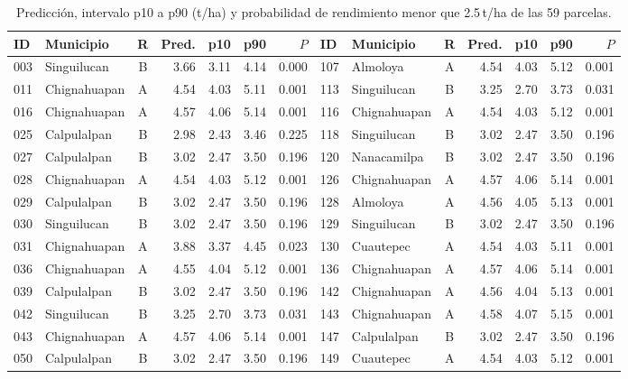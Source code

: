 \documentclass[conference,letterpaper]{IEEEtran}
\begin{document}
\begin{table}[!t]
\centering
\caption{Predicción, intervalo p10 a p90 (t/ha) y probabilidad de rendimiento menor que 2.5\,t/ha de las 59 parcelas.}
\label{tab:predicciones}
\scriptsize
\setlength{\tabcolsep}{3.5pt}
\begin{tabular}{@{}llcrrrr@{\hspace{1.6em}}llcrrrr@{}}
\toprule
ID & Municipio & R & Pred. & p10 & p90 & $P$ & ID & Municipio & R & Pred. & p10 & p90 & $P$ \\
\midrule
003 & Singuilucan & B & 3.66 & 3.11 & 4.14 & 0.000 & 107 & Almoloya & A & 4.54 & 4.03 & 5.12 & 0.001 \\
011 & Chignahuapan & A & 4.54 & 4.03 & 5.11 & 0.001 & 113 & Singuilucan & B & 3.25 & 2.70 & 3.73 & 0.031 \\
016 & Chignahuapan & A & 4.57 & 4.06 & 5.14 & 0.001 & 116 & Chignahuapan & A & 4.54 & 4.03 & 5.12 & 0.001 \\
025 & Calpulalpan & B & 2.98 & 2.43 & 3.46 & 0.225 & 118 & Singuilucan & B & 3.02 & 2.47 & 3.50 & 0.196 \\
027 & Calpulalpan & B & 3.02 & 2.47 & 3.50 & 0.196 & 120 & Nanacamilpa & B & 3.02 & 2.47 & 3.50 & 0.196 \\
028 & Chignahuapan & A & 4.54 & 4.03 & 5.12 & 0.001 & 126 & Chignahuapan & A & 4.57 & 4.06 & 5.14 & 0.001 \\
029 & Calpulalpan & B & 3.02 & 2.47 & 3.50 & 0.196 & 128 & Almoloya & A & 4.56 & 4.05 & 5.13 & 0.001 \\
030 & Singuilucan & B & 3.02 & 2.47 & 3.50 & 0.196 & 129 & Singuilucan & B & 3.02 & 2.47 & 3.50 & 0.196 \\
031 & Chignahuapan & A & 3.88 & 3.37 & 4.45 & 0.023 & 130 & Cuautepec & A & 4.54 & 4.03 & 5.11 & 0.001 \\
036 & Chignahuapan & A & 4.55 & 4.04 & 5.12 & 0.001 & 136 & Chignahuapan & A & 4.57 & 4.06 & 5.14 & 0.001 \\
039 & Calpulalpan & B & 3.02 & 2.47 & 3.50 & 0.196 & 142 & Chignahuapan & A & 4.56 & 4.04 & 5.13 & 0.001 \\
042 & Singuilucan & B & 3.25 & 2.70 & 3.73 & 0.031 & 143 & Chignahuapan & A & 4.58 & 4.07 & 5.15 & 0.001 \\
043 & Chignahuapan & A & 4.57 & 4.06 & 5.14 & 0.001 & 147 & Calpulalpan & B & 3.02 & 2.47 & 3.50 & 0.196 \\
050 & Calpulalpan & B & 3.02 & 2.47 & 3.50 & 0.196 & 149 & Cuautepec & A & 4.54 & 4.03 & 5.12 & 0.001 \\

\end{tabular}
\end{table}
\end{document}
